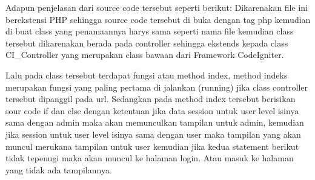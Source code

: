 Adapun penjelasan dari source code tersebut seperti berikut:
Dikarenakan file ini berekstensi PHP sehingga source code tersebut di buka dengan tag php kemudian di buat class yang penamaannya harys sama seperti nama file kemudian class tersebut dikarenakan berada pada controller sehingga ekstends kepada class CI\_Controller yang merupakan class bawaan dari Framework CodeIgniter.\par
Lalu pada class tersebut terdapat fungsi atau method index, method indeks merupakan fungsi yang paling pertama di jalankan (running) jika class controller tersebut dipanggil pada url. Sedangkan pada method index tersebut berisikan sour code if dan else dengan ketentuan jika data session untuk user level isinya sama dengan admin maka akan memunculkan tampilan untuk admin, kemudian jika session untuk user level isinya sama dengan user maka tampilan yang akan muncul merukana tampilan untuk user kemudian jika kedua statement berikut tidak tepenugi maka akan muncul ke halaman login. Atau masuk ke halaman yang tidak ada tampilannya.\par

